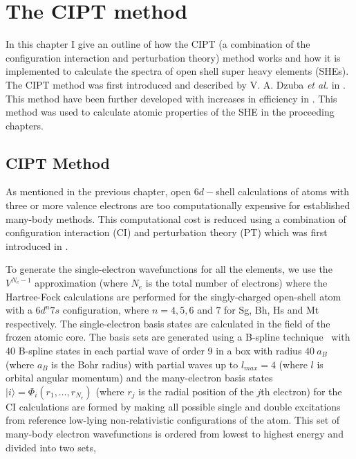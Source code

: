 \documentclass[10pt,a4paper, twoside, openright]{report}
\begin{document}
\chapter{The CIPT method} \label{chap:CIPT}
In this chapter I give an outline of how the CIPT (a combination of the configuration interaction and perturbation theory) method works and how it is implemented to calculate the spectra of open shell super heavy elements (SHEs). The CIPT method was first introduced and described by V. A. Dzuba \textit{et al.} in \cite{DBHF2017}. This method have been further developed with increases in efficiency in \cite{FCI}. This method was used to calculate atomic properties of the SHE in the proceeding chapters.
\iffalse
\section{CIPT Method} \label{sec:CIPT}

As mentioned in the previous chapter, open $6d-$shell calculations of atoms with  three or more valence electrons are too computationally expensive for established many-body methods. This computational cost is reduced using a combination of configuration interaction (CI) and perturbation theory (PT) which was first introduced in \cite{DBHF2017}. 

To generate the single-electron wavefunctions for all the elements,  we use the $V^{N_e-1}$ approximation (where $N_e$ is the total number of electrons) \cite{Kelly1964, Dzuba2005} where the Hartree-Fock calculations are performed for the singly-charged open-shell atom with a   $6d^n7s$ configuration, where $n=4,5,6$ and $7$ for Sg, Bh, Hs and Mt respectively. The  single-electron basis states are calculated in the field of the frozen atomic core. The basis sets are generated using a  B-spline technique~\cite{Johnson1988}  with 40 B-spline states in each partial wave of order 9 in a box with radius $40 \ a_B$ (where $a_B$ is the Bohr radius) with partial waves up to $l_{max}=4$ (where $l$ is orbital angular momentum) and the many-electron basis states $|i \rangle = \Phi_i(r_1,\dots,r_{N_e})$ (where $r_j$ is the radial position of the $j$th electron)  for the CI calculations are formed by making all possible single and double excitations from reference low-lying non-relativistic configurations of the atom. This set of many-body electron wavefunctions is ordered from lowest to highest energy and divided into two sets, 
\end{document}
